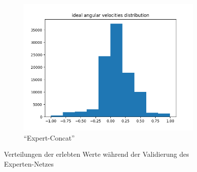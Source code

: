 \begin{figure}[H]
\begin{subfigure}[h]{0.4\textwidth}
		\includegraphics[width=\linewidth]{kapitel5/images/eval/expert/expert-concat-distr.png}
		\caption{``Expert-Concat''}
		\label{expert-concat-val-distr}
	\end{subfigure}
	\caption{Verteilungen der erlebten Werte während der Validierung des Experten-Netzes}
	\label{expert-val-distr}
\end{figure}

